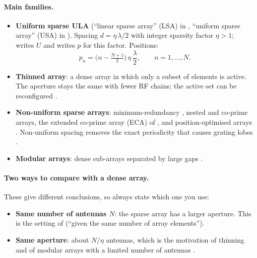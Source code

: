 \documentclass[11pt]{article}
\begin{document}
\paragraph{Main families.}
\begin{itemize}
  \item \textbf{Uniform sparse ULA} (``linear sparse array'' (LSA) in \cite{zhou2025sparse}, ``uniform sparse array'' (USA) in \cite{chen2024nearfield}). Spacing $d=\eta\,\lambda/2$ with integer sparsity factor $\eta>1$; \cite{zhou2025sparse} writes $U$ and \cite{chen2024nearfield} writes $p$ for this factor. Positions:
  \begin{equation}
    p_n=\Big(n-\tfrac{N+1}{2}\Big)\,\eta\,\frac{\lambda}{2},\qquad n=1,\dots,N.
    \label{eq:pos}
  \end{equation}
  \item \textbf{Thinned array}: a dense array in which only a subset of elements is active. The aperture stays the same with fewer RF chains; the active set can be reconfigured \cite{hussain2026thinning}.
  \item \textbf{Non-uniform sparse arrays}: minimum-redundancy \cite{moffet1968mra}, nested \cite{pal2010nested} and co-prime \cite{vaidyanathan2011coprime} arrays, the extended co-prime array (ECA) of \cite{zhou2025sparse}, and position-optimised arrays \cite{chen2024nearfield}. Non-uniform spacing removes the exact periodicity that causes grating lobes \cite{chen2024nearfield,zhou2025sparse}.
  \item \textbf{Modular arrays}: dense sub-arrays separated by large gaps \cite{li2023modular,kosasih2025mla}.
\end{itemize}

\paragraph{Two ways to compare with a dense array.}
These give different conclusions, so always state which one you use:
\begin{itemize}
  \item \textbf{Same number of antennas $N$}: the sparse array has a larger aperture. This is the setting of \cite{wang2024sparsemimo,zhou2025sparse} (``given the same number of array elements'').
  \item \textbf{Same aperture}: about $N/\eta$ antennas, which is the motivation of thinning \cite{hussain2026thinning} and of modular arrays with a limited number of antennas \cite{kosasih2025mla}.
\end{itemize}
\end{document}
